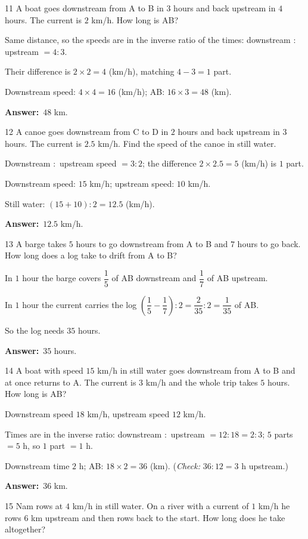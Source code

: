 \documentclass[11pt]{article}
\newif\ifsol \solfalse
\providecommand{\AnsWord}{Đáp số}
\newcommand{\dapso}[1]{\par\textbf{\AnsWord:}\ #1}
\newcommand{\probsol}[1]{%
  \begin{lrbox}{\solmeasure}\begin{minipage}{\dimexpr\linewidth-24pt\relax}#1\end{minipage}\end{lrbox}%
  \ifsol
    \begin{solbox}#1\end{solbox}%
  \else
    \setlength{\solht}{\dimexpr\ht\solmeasure+\dp\solmeasure+0.85cm\relax}%
    \ifdim\solht<1.35cm\setlength{\solht}{1.35cm}\fi
    \begin{tcolorbox}[colback=white,colframe=Line,boxrule=0.8pt,arc=5pt,
      left=8pt,right=8pt,top=4pt,bottom=4pt,height=\solht]{\footnotesize\color{Slate}\itshape\WorkWord}\end{tcolorbox}%
  \fi}
\newcommand{\gap}{\vspace{0.3cm}}
\def\WorkWord{Your work:}
\def\AnsWord{Answer}
\begin{document}
\begin{probbox}{11}{\relax}
A boat goes downstream from A to B in $3$ hours and back upstream in $4$ hours. The current is $2$ km/h. How long is AB?
\end{probbox}
\probsol{
Same distance, so the speeds are in the inverse ratio of the times: downstream $:$ upstream $=4:3$.\par
Their difference is $2\times2=4$ (km/h), matching $4-3=1$ part.\par
Downstream speed: $4\times4=16$ (km/h); AB: $16\times3=48$ (km).
\dapso{$48$ km.}}
\gap
\begin{probbox}{12}{\relax}
A canoe goes downstream from C to D in $2$ hours and back upstream in $3$ hours. The current is $2.5$ km/h. Find the speed of the canoe in still water.
\end{probbox}
\probsol{
Downstream $:$ upstream speed $=3:2$; the difference $2\times2.5=5$ (km/h) is $1$ part.\par
Downstream speed: $15$ km/h; upstream speed: $10$ km/h.\par Still water: $(15+10):2=12.5$ (km/h).
\dapso{$12.5$ km/h.}}
\gap
\begin{probbox}{13}{\relax}
A barge takes $5$ hours to go downstream from A to B and $7$ hours to go back. How long does a log take to drift from A to B?
\end{probbox}
\probsol{
In $1$ hour the barge covers $\dfrac15$ of AB downstream and $\dfrac17$ of AB upstream.\par
In $1$ hour the current carries the log $\left(\dfrac15-\dfrac17\right):2=\dfrac2{35}:2=\dfrac1{35}$ of AB.\par So the log needs $35$ hours.
\dapso{$35$ hours.}}
\gap
\begin{probbox}{14}{\relax}
A boat with speed $15$ km/h in still water goes downstream from A to B and at once returns to A. The current is $3$ km/h and the whole trip takes $5$ hours. How long is AB?
\end{probbox}
\probsol{
Downstream speed $18$ km/h, upstream speed $12$ km/h.\par
Times are in the inverse ratio: downstream $:$ upstream $=12:18=2:3$; $5$ parts $=5$ h, so $1$ part $=1$ h.\par
Downstream time $2$ h; AB: $18\times2=36$ (km). (\emph{Check:} $36:12=3$ h upstream.)
\dapso{$36$ km.}}
\gap
\begin{probbox}{15}{\relax}
Nam rows at $4$ km/h in still water. On a river with a current of $1$ km/h he rows $6$ km upstream and then rows back to the start. How long does he take altogether?
\end{probbox}
\end{document}
